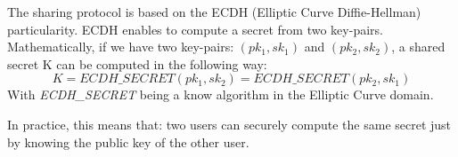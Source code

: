 \documentclass[../main.tex]{subfiles}
\begin{document}
\medbreak
\par The sharing protocol is based on the ECDH (Elliptic Curve Diffie-Hellman) particularity. ECDH enables to compute a secret from two key-pairs. Mathematically, if we have two key-pairs: $(pk_1, sk_1)$ and $(pk_2, sk_2)$, a shared secret K can be computed in the following way:
\begin{equation}
    \label{equation:lauxus:ecdh_secret}
    K = ECDH\_SECRET(pk_1, sk_2) = ECDH\_SECRET(pk_2, sk_1)
\end{equation}
With \textit{ECDH\_SECRET} being a know algorithm in the Elliptic Curve domain.
\par In practice, this means that: two users can securely compute the same secret just by knowing the public key of the other user.
\end{document}
